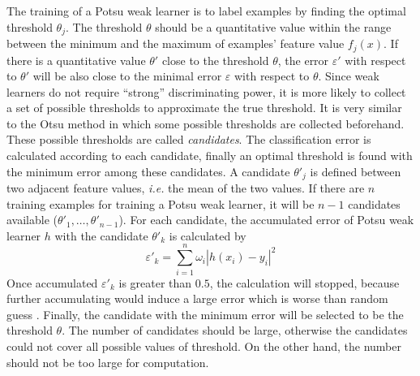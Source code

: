\documentclass[a4paper,10pt]{article}
\begin{document}
The training of a Potsu weak learner is to label examples by finding the optimal threshold $\theta_{j}$. The threshold $\theta$ should be a quantitative value within the range between the minimum and the maximum of examples' feature value $f_{j}(x)$. If there is a quantitative value $\theta'$ close to the threshold $\theta$, the error $\varepsilon'$ with respect to $\theta'$ will be also close to the minimal error $\varepsilon$ with respect to $\theta$. Since weak learners do not require ``strong'' discriminating power, it is more likely to collect a set of possible thresholds to approximate the true threshold. It is very similar to the Otsu method in which some possible thresholds are collected beforehand. These possible thresholds are called \textit{candidates}. The classification error is calculated according to each candidate, finally an optimal threshold is found with the minimum error among these candidates. A candidate $\theta'_j$ is defined between two adjacent feature values, \textit{i.e.} the mean of the two values. If there are $n$ training examples for training a Potsu weak learner, it will be $n-1$ candidates available ($\theta'_{1},\ldots,\theta'_{n-1}$). For each candidate, the accumulated error of Potsu weak learner $h$ with the candidate $\theta'_{k}$ is calculated by
\begin{equation} 
 \varepsilon'_{k} = \sum_{i=1}^{n}\omega_{i}|h(x_{i})-y_{i}|^{2}
\end{equation}
Once accumulated $\varepsilon'_{k}$ is greater than $0.5$, the calculation will stopped, because further accumulating would induce a large error which is worse than random guess \cite{Freund1995}. Finally, the candidate with the minimum error will be selected to be the threshold $\theta$. The number of candidates should be large, otherwise the candidates could not cover all possible values of threshold. On the other hand, the number should not be too large for computation.
\end{document}
